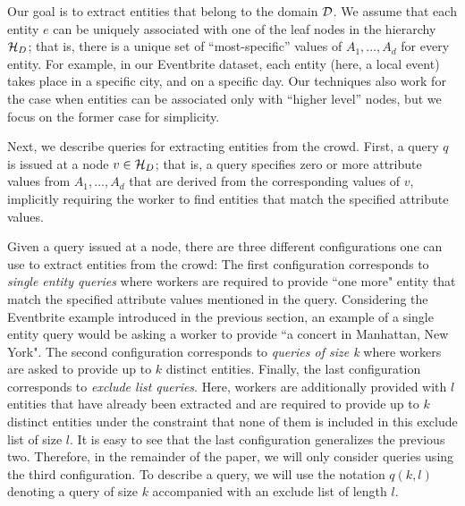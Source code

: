  Our goal is to extract entities that belong to the domain $\mathcal{D}$. We assume that each entity $e$ can be uniquely associated with one of the leaf nodes in the hierarchy $\mathcal{H}_D$; that is, there is a unique set of ``most-specific'' values of $A_1, \ldots, A_d$ for every entity. For example, in our Eventbrite dataset, each entity (here, a local event) takes place in a specific city, and on a specific day. Our techniques also work for the case when entities can be associated only with ``higher level'' nodes, but we focus on the former case for simplicity.

 Next, we describe queries for extracting entities from the crowd. First, a query $q$ is issued at a node $v \in \mathcal{H}_D$; that is, a query specifies zero or more attribute values from $A_1, \ldots, A_d$ that are derived from the corresponding values of $v$, implicitly requiring the worker to find entities that match the specified attribute values.  

Given a query issued at a node, there are three different configurations one can use to extract entities from the crowd: The first configuration corresponds to {\em single entity queries} where workers are required to provide ``one more" entity that match the specified attribute values mentioned in the query. Considering the Eventbrite example introduced in the previous section, an example of a single entity query would be asking a worker to provide ``a concert in Manhattan, New York". The second configuration corresponds to {\em queries of size k} where workers are asked to provide up to $k$ distinct entities. Finally, the last configuration corresponds to {\em exclude list queries}. Here,  workers are additionally provided with $l$ entities that have already been extracted and are required to provide up to $k$ distinct entities under the constraint that none of them is included in this exclude list of size $l$. It is easy to see that the last configuration generalizes the previous two. Therefore, in the remainder of the paper, we will only consider queries using the third configuration. To describe a query, we will use the notation $q(k,l)$ denoting a query of size $k$ accompanied with an exclude list of length $l$. 

